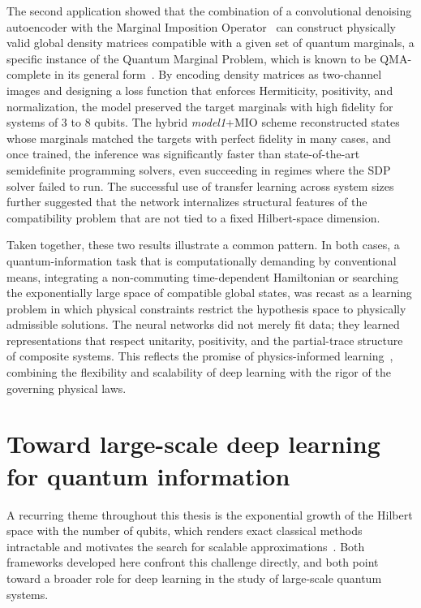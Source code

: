 The second application showed that the combination of a convolutional denoising autoencoder with the Marginal Imposition Operator~\cite{uzcategui2022mio} can construct physically valid global density matrices compatible with a given set of quantum marginals, a specific instance of the Quantum Marginal Problem, which is known to be QMA-complete in its general form~\cite{liu2006consistency, broadbent2022qma}. By encoding density matrices as two-channel images and designing a loss function that enforces Hermiticity, positivity, and normalization, the model preserved the target marginals with high fidelity for systems of 3 to 8 qubits. The hybrid \textit{model1}+MIO scheme reconstructed states whose marginals matched the targets with perfect fidelity in many cases, and once trained, the inference was significantly faster than state-of-the-art semidefinite programming solvers, even succeeding in regimes where the SDP solver failed to run. The successful use of transfer learning across system sizes further suggested that the network internalizes structural features of the compatibility problem that are not tied to a fixed Hilbert-space dimension.

Taken together, these two results illustrate a common pattern. In both cases, a quantum-information task that is computationally demanding by conventional means, integrating a non-commuting time-dependent Hamiltonian or searching the exponentially large space of compatible global states, was recast as a learning problem in which physical constraints restrict the hypothesis space to physically admissible solutions. The neural networks did not merely fit data; they learned representations that respect unitarity, positivity, and the partial-trace structure of composite systems. This reflects the promise of physics-informed learning~\cite{Raissi2019, karniadakis2021}, combining the flexibility and scalability of deep learning with the rigor of the governing physical laws.

\section{Toward large-scale deep learning for quantum information}
\label{sec:conc-scale}

A recurring theme throughout this thesis is the exponential growth of the Hilbert space with the number of qubits, which renders exact classical methods intractable and motivates the search for scalable approximations~\cite{lloyd1996}. Both frameworks developed here confront this challenge directly, and both point toward a broader role for deep learning in the study of large-scale quantum systems.

